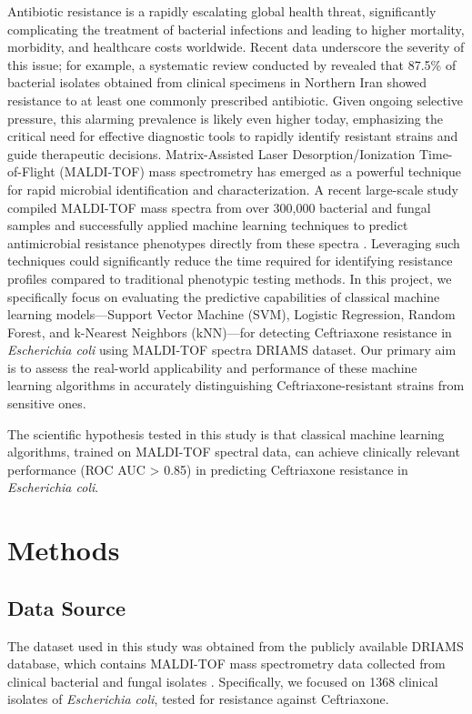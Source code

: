 \documentclass{article}
\begin{document}
Antibiotic resistance is a rapidly escalating global health threat, significantly complicating the treatment of bacterial infections and leading to higher mortality, morbidity, and healthcare costs worldwide. Recent data underscore the severity of this issue; for example, a systematic review conducted by \citet{IranBacteria} revealed that 87.5\% of bacterial isolates obtained from clinical specimens in Northern Iran showed resistance to at least one commonly prescribed antibiotic. Given ongoing selective pressure, this alarming prevalence is likely even higher today, emphasizing the critical need for effective diagnostic tools to rapidly identify resistant strains and guide therapeutic decisions.
Matrix-Assisted Laser Desorption/Ionization Time-of-Flight (MALDI-TOF) mass spectrometry has emerged as a powerful technique for rapid microbial identification and characterization. A recent large-scale study compiled MALDI-TOF mass spectra from over 300,000 bacterial and fungal samples and successfully applied machine learning techniques to predict antimicrobial resistance phenotypes directly from these spectra \citep{datasetExplaination, Astudillo2024}. Leveraging such techniques could significantly reduce the time required for identifying resistance profiles compared to traditional phenotypic testing methods.
In this project, we specifically focus on evaluating the predictive capabilities of classical machine learning models—Support Vector Machine (SVM), Logistic Regression, Random Forest, and k-Nearest Neighbors (kNN)—for detecting Ceftriaxone resistance in \textit{Escherichia coli} using MALDI-TOF spectra DRIAMS dataset. Our primary aim is to assess the real-world applicability and performance of these machine learning algorithms in accurately distinguishing Ceftriaxone-resistant strains from sensitive ones.

The scientific hypothesis tested in this study is that classical machine learning algorithms, trained on MALDI-TOF spectral data, can achieve clinically relevant performance (ROC AUC > 0.85) in predicting Ceftriaxone resistance in \textit{Escherichia coli}.

\section{Methods}

\subsection{Data Source}
The dataset used in this study was obtained from the publicly available DRIAMS database, which contains MALDI-TOF mass spectrometry data collected from clinical bacterial and fungal isolates \citep{datasetExplaination}. Specifically, we focused on 1368 clinical isolates of \textit{Escherichia coli}, tested for resistance against Ceftriaxone.
\end{document}
